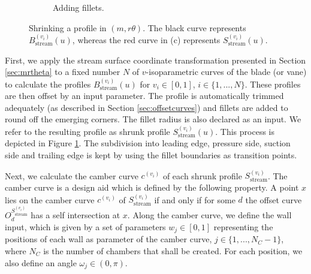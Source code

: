 \documentclass[a4paper, 11pt]{report}
\theoremstyle{definition}
\begin{document}
\begin{figure}[H]
\begin{subfigure}{.32\textwidth}
			\caption{Adding fillets.}
		\end{subfigure}
		\caption{Shrinking a profile in $(m, r\theta)$. The black curve represents $B^{(v_i)}_\textrm{stream}(u)$, whereas the red curve in (c) represents $S^{(v_i)}_\textrm{stream}(u)$.}
		\label{fig:profileshrinking}
	\end{figure}

	First, we apply the stream surface coordinate transformation presented in Section \ref{sec:mrtheta} to a fixed number $N$ of $v$-isoparametric curves of the blade (or vane) to calculate the profiles $B^{(v_i)}_\textrm{stream}(u)$ for $v_i \in [0,1]$, $i \in \{1,...,N\}$. These profiles are then offset by an input parameter. The profile is automatically trimmed adequately (as described in Section \ref{sec:offsetcurves}) and fillets are added to round off the emerging corners. The fillet radius is also declared as an input. We refer to the resulting profile as shrunk profile $S^{(v_i)}_\textrm{stream}(u)$. This process is depicted in Figure \ref{fig:profileshrinking}. The subdivision into leading edge, pressure side, suction side and trailing edge is kept by using the fillet boundaries as transition points.

	Next, we calculate the camber curve $c^{(v_i)}$ of each shrunk profile $S^{(v_i)}_\textrm{stream}$. The camber curve is a design aid which is defined by the following property. A point $x$ lies on the camber curve $c^{(v_i)}$ of $S^{(v_i)}_\textrm{stream}$ if and only if for some $d$ the offset curve $O^{S^{(v_i)}_\textrm{stream}}_d$ has a self intersection at $x$. Along the camber curve, we define the wall input, which is given by a set of parameters $w_j \in [0,1]$ representing the positions of each wall as parameter of the camber curve, $j \in \{1,...,N_C-1\}$, where $N_C$ is the number of chambers that shall be created. For each position, we also define an angle $\omega_j \in (0, \pi)$.
\end{document}

